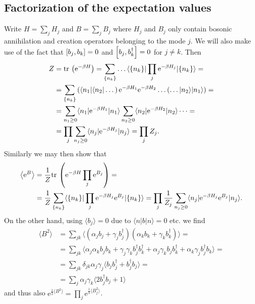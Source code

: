 \documentclass[english, parskip=full]{scrartcl}
\DeclarePairedDelimiter\klam{[}{]}
\newcommand{\e}{\text{e}}
\begin{document}
\subsection{Factorization of the expectation values}\label{subsec:factorization}
Write $H=\sum_j H_j$ and $B=\sum_j B_j$ where $H_j$ and $B_j$ only contain bosonic annihilation and creation operators belonging to the mode $j$.
We will also make use of the fact that $\klam*{b_j, b_k} = 0$ and $\klam*{b_j, b_k^\dagger} = 0$ for $j\neq k$.
Then 
\begin{align}
Z &= \text{tr\,} \left( \e^{-\beta H} \right) = \sum_{ \{n_k\}} \dots \langle \{n_k\}  | \prod_j \e^{-\beta H_j} |  \{n_k\} \rangle = \\
&= \sum_{ \{n_k\}} \left( \langle n_1 | \langle n_2 | \dots \right) \e^{-\beta H_1} \e^{-\beta H_2} \dots \left( \dots |n_2 \rangle | n_1 \rangle \right) = \\
&= \sum_{n_1\ge 0}  \langle n_1  | \e^{-\beta H_1} | n_1 \rangle \sum_{n_2\ge 0} \langle n_2  | \e^{-\beta H_2} | n_2 \rangle \dots = \\
&= \prod_j \sum_{n_j\ge 0} \langle n_j  | \e^{-\beta H_j} | n_j \rangle = \prod_j Z_j.
\end{align}
Similarly we may then show that
\begin{align}
\left\langle \e^B \right\rangle &= \frac{1}{Z} \text{tr\,} \left( \e^{-\beta H} \prod_j \e^{B_j} \right) = \\
&= \frac{1}{Z} \sum_{\{n_k\}} \langle \{n_k\} | \prod_j \e^{-\beta H_j} \e^{B_j} | \{n_k\} \rangle = \prod_j \frac{1}{Z_j} \sum_{n_j\ge 0} \langle n_j  | \e^{-\beta H_j} \e^{B_j} | n_j \rangle.
\end{align}
On the other hand, using $\langle b_j \rangle = 0$ due to $\langle n | b | n \rangle = 0$ etc. we find
\begin{align}
\langle B^2 \rangle &= \sum_{jk} \langle \left( \alpha_jb_j + \gamma_jb_j^\dagger \right) \left( \alpha_kb_k + \gamma_kb_k^\dagger \right)  \rangle = \\
&= \sum_{jk} \langle \alpha_j\alpha_k b_jb_k + \gamma_j\gamma_k b_j^\dagger b_k^\dagger + \alpha_j\gamma_k b_jb_k^\dagger + \alpha_k\gamma_j b_j^\dagger b_k \rangle = \\
&= \sum_{jk} \delta_{jk} \alpha_j \gamma_j \langle b_jb_j^\dagger + b_j^\dagger b_j \rangle = \\
&= \sum_j \alpha_j\gamma_k \langle 2b_j^\dagger b_j + 1 \rangle
\end{align}
and thus also $\e^{\frac{1}{2} \langle B^2 \rangle} = \prod_j \e^{\frac{1}{2} \langle B_j^2 \rangle}$.
\end{document}
